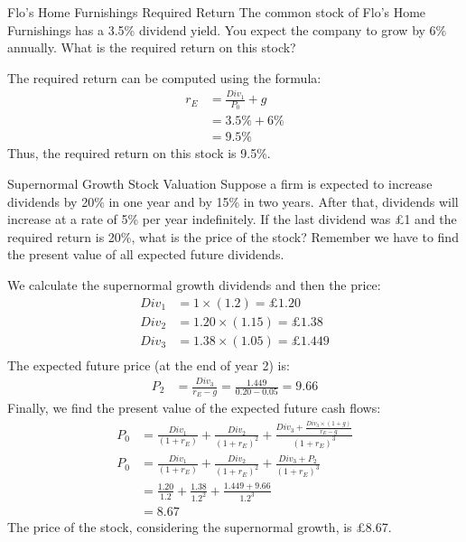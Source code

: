     \begin{examplebox}{Flo's Home Furnishings Required Return}
        The common stock of Flo’s Home Furnishings has a 3.5\% dividend yield. You expect the company to grow by 6\% annually. What is the required return on this stock?
        
        The required return can be computed using the formula:
        \begin{align*}
            r_E &= \frac{Div_1}{P_0} + g \\
            &= 3.5\% + 6\% \\
            &= 9.5\%
        \end{align*}
        Thus, the required return on this stock is 9.5\%.
        \end{examplebox}
             
        \begin{examplebox}{Supernormal Growth Stock Valuation}
            Suppose a firm is expected to increase dividends by 20\% in one year and by 15\% in two years. After that, dividends will increase at a rate of 5\% per year indefinitely. If the last dividend was £1 and the required return is 20\%, what is the price of the stock? Remember we have to find the present value of all expected future dividends.
            
            We calculate the supernormal growth dividends and then the price:
            \begin{align*}
                Div_1 &= 1 \times (1.2) = £1.20 \\
                Div_2 &= 1.20 \times (1.15) = £1.38 \\
                Div_3 &= 1.38 \times (1.05) = £1.449 \\
            \end{align*}
            The expected future price (at the end of year 2) is:
            \begin{align*}
                P_2 &= \frac{Div_3}{r_E - g} = \frac{1.449}{0.20 - 0.05} = 9.66
            \end{align*}
            Finally, we find the present value of the expected future cash flows:
            \begin{align*}
                P_0 &= \frac{Div_1}{(1 + r_E)} + \frac{Div_2}{(1 + r_E)^2} + \frac{Div_3 + \frac{Div_3 \times (1+g)}{r_E - g}}{(1 + r_E)^3}\\
                P_0 &= \frac{Div_1}{(1 + r_E)} + \frac{Div_2}{(1 + r_E)^2} + \frac{Div_3 + P_2}{(1 + r_E)^3}\\
                    &= \frac{1.20}{1.2} + \frac{1.38}{1.2^2} + \frac{1.449 + 9.66}{1.2^3} \\
                &= 8.67
            \end{align*}
            The price of the stock, considering the supernormal growth, is £8.67.
        \end{examplebox}
            
